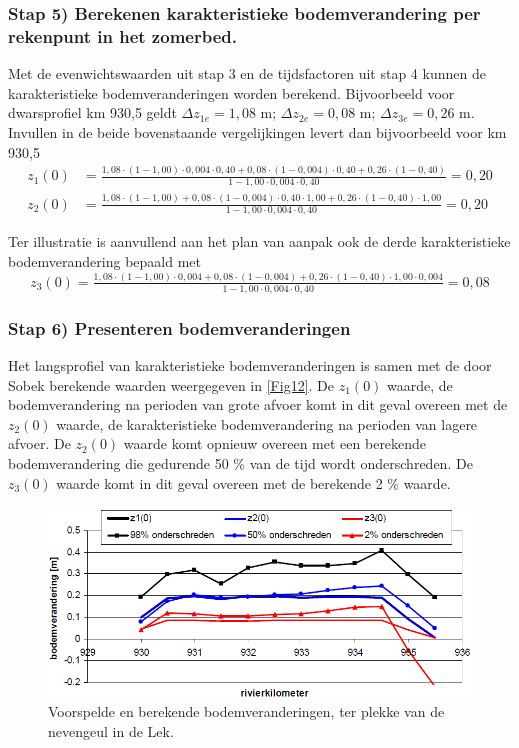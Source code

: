 \subsubsection*{Stap 5) Berekenen karakteristieke bodemverandering per rekenpunt in het zomerbed.}

Met de evenwichtswaarden uit stap 3 en de tijdsfactoren uit stap 4 kunnen de karakteristieke bodemveranderingen worden berekend.
Bijvoorbeeld voor dwarsprofiel km 930,5 geldt $\Delta z_{1e}=1,08$ m; $\Delta z_{2e}=0,08$ m; $\Delta z_{3e}=0,26$ m.
Invullen in de beide bovenstaande vergelijkingen levert dan bijvoorbeeld voor km 930,5
%
\begin{align}
z_1(0) &= \tfrac{1,08 \cdot (1-1,00) \cdot 0,004 \cdot 0,40 + 0,08 \cdot (1-0,004) \cdot 0,40 + 0,26 \cdot (1-0,40)}{1 - 1,00 \cdot 0,004 \cdot 0,40} = 0,20\\
z_2(0) &= \tfrac{1,08 \cdot (1-1,00) + 0,08 \cdot (1-0,004) \cdot 0,40 \cdot 1,00 + 0,26 \cdot (1-0,40) \cdot 1,00}{1 - 1,00 \cdot 0,004 \cdot 0,40} = 0,20
\end{align}

Ter illustratie is aanvullend aan het plan van aanpak ook de derde karakteristieke bodemverandering bepaald met
%
\begin{equation}
z_3(0) = \tfrac{1,08 \cdot (1-1,00) \cdot 0,004 + 0,08 \cdot (1-0,004) + 0,26 \cdot (1-0,40) \cdot 1,00 \cdot 0,004}{1 - 1,00 \cdot 0,004 \cdot 0,40} = 0,08
\end{equation}

\subsubsection*{Stap 6) Presenteren bodemveranderingen}

Het langsprofiel van karakteristieke bodemveranderingen is samen met de door Sobek berekende waarden weergegeven in \autoref{Fig12}.
De $z_1(0)$ waarde, de bodemverandering na perioden van grote afvoer komt in dit geval overeen met de $z_2(0)$ waarde, de karakteristieke bodemverandering na perioden van lagere afvoer.
De $z_2(0)$ waarde komt opnieuw overeen met een berekende bodemverandering die gedurende 50 \% van de tijd wordt onderschreden.
De $z_3(0)$ waarde komt in dit geval overeen met de berekende 2 \% waarde.

\begin{figure}
\includegraphics[width=\columnwidth]{figures/Fig12.png}
\caption{Voorspelde en berekende bodemveranderingen, ter plekke van de nevengeul in de Lek.}
\label{Fig12}
\end{figure}

